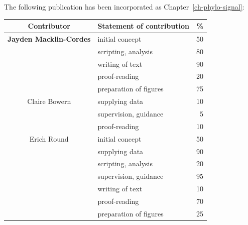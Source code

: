 \cleartoevenpage
\pagestyle{empty}	

\noindent
The following publication has been incorporated as Chapter~\ref{ch-phylo-signal}:\\

\noindent
{}

\begin{table}[h]
	\centering
	\begin{tabular}{clr}
		\toprule
		Contributor & Statement of contribution & \% \\
		\midrule
		\textbf{Jayden Macklin-Cordes}	& initial concept			& 50 \\
		                                & scripting, analysis       & 80 \\
		                                & writing of text 			& 90 \\
										& proof-reading				& 20 \\
										& preparation of figures 	& 75 \\
		\midrule
		Claire Bowern                   & supplying data            & 10 \\
										& supervision, guidance 	& 5  \\
										& proof-reading             & 10 \\
		\midrule
		Erich Round 					& initial concept			& 50 \\
		                                & supplying data            & 90 \\
		                                & scripting, analysis       & 20 \\
		                                & supervision, guidance 	& 95 \\
		                                & writing of text 			& 10 \\
										& proof-reading				& 70 \\
										& preparation of figures 	& 25 \\
										
		\bottomrule
	\end{tabular}
\end{table}

